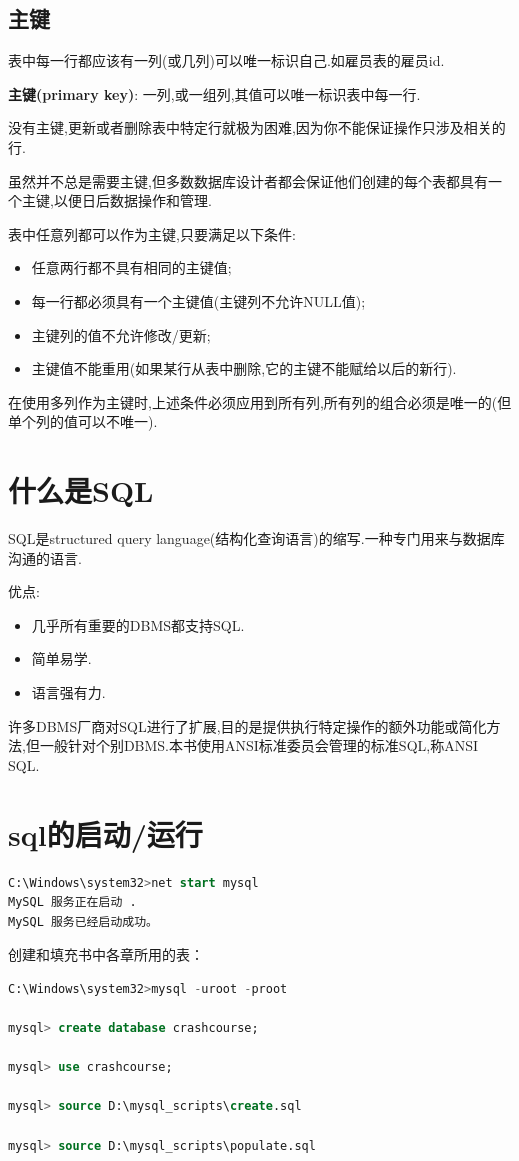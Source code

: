 \documentclass[11pt,a4paper,oneside]{book}
\begin{document}
\subsection{主键}
表中每一行都应该有一列(或几列)可以唯一标识自己.如雇员表的雇员id.
\begin{tcolorbox}[colback=blue!7!white,colframe=blue!40]
\textbf{主键(primary key)}: 一列,或一组列,其值可以唯一标识表中每一行.
\end{tcolorbox}
没有主键,更新或者删除表中特定行就极为困难,因为你不能保证操作只涉及相关的行.
\begin{tcolorbox}[colback=pink!10!white,colframe=pink!100!black]
虽然并不总是需要主键,但多数数据库设计者都会保证他们创建的每个表都具有一个主键,以便日后数据操作和管理.
\end{tcolorbox}
表中任意列都可以作为主键,只要满足以下条件:
\begin{itemize}
	\item 任意两行都不具有相同的主键值;
	\item 每一行都必须具有一个主键值(主键列不允许NULL值);
	\item 主键列的值不允许修改/更新;
	\item 主键值不能重用(如果某行从表中删除,它的主键不能赋给以后的新行).
\end{itemize}
在使用多列作为主键时,上述条件必须应用到所有列,所有列的组合必须是唯一的(但单个列的值可以不唯一).
\section{什么是SQL}
SQL是structured query language(结构化查询语言)的缩写.一种专门用来与数据库沟通的语言.

优点:
\begin{itemize}
	\item 几乎所有重要的DBMS都支持SQL.
	\item 简单易学.
	\item 语言强有力.
\end{itemize}
\begin{tcolorbox}[colback=pink!10!white,colframe=pink!100!black]
许多DBMS厂商对SQL进行了扩展,目的是提供执行特定操作的额外功能或简化方法,但一般针对个别DBMS.本书使用ANSI标准委员会管理的标准SQL,称ANSI SQL.
\end{tcolorbox}

\section{sql的启动/运行}

\begin{lstlisting}[language=sql]
C:\Windows\system32>net start mysql
MySQL 服务正在启动 .
MySQL 服务已经启动成功。
\end{lstlisting}
创建和填充书中各章所用的表：
\begin{lstlisting}[language=sql]
C:\Windows\system32>mysql -uroot -proot

mysql> create database crashcourse;

mysql> use crashcourse;

mysql> source D:\mysql_scripts\create.sql 

mysql> source D:\mysql_scripts\populate.sql

\end{lstlisting}
\end{document}
